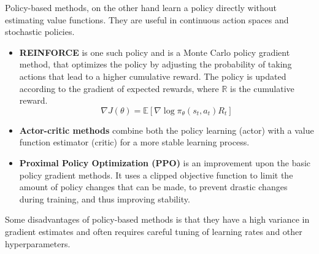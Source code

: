 Policy-based methods, on the other hand learn a policy directly without estimating
value functions. They are useful in continuous action spaces and stochastic policies.
\begin{itemize}
      \item \textbf{REINFORCE} is one such policy and is a Monte Carlo policy gradient method, 
      that optimizes the policy by adjusting the probability of taking actions that lead to a 
      higher cumulative reward. The policy is updated according to the gradient of expected rewards,
      where \(\mathbb{R}\) is the cumulative reward. \cite{Types-of-Reinforcement-Learning} %
      \begin{equation}
            \nabla J(\theta) = \mathbb{E} \left[\nabla \log \pi_{\theta}(s_t,a_t) R_t \right]
            \label{equation:policy_gradient}
      \end{equation}
      \item \textbf{Actor-critic methods} combine both the policy learning (actor) with a value
      function estimator (critic) for a more stable learning process. \cite{Types-of-Reinforcement-Learning}
      \item \textbf{Proximal Policy Optimization (PPO)} is an improvement upon the basic policy
      gradient methods. It uses a clipped objective function to limit the amount of policy 
      changes that can be made, to prevent drastic changes during training, and thus improving stability. \cite{Types-of-Reinforcement-Learning}
\end{itemize}
Some disadvantages of policy-based methods is that they have a high variance in gradient estimates and often requires careful 
tuning of learning rates and other hyperparameters. \cite{Types-of-Reinforcement-Learning}

